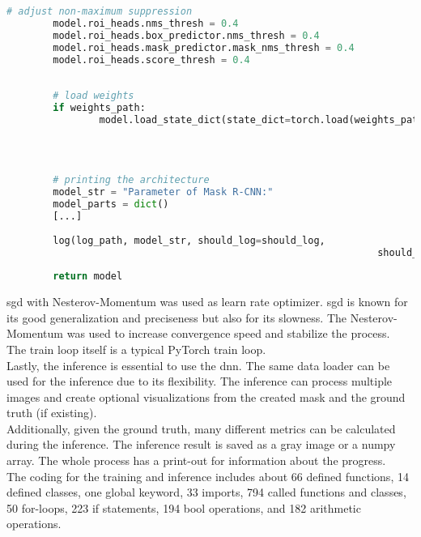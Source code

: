 \begin{lstlisting}[language=Python,caption=Loading function of Mask R-CNN using torchvision, label=lst:model-loading]
		# adjust non-maximum suppression
		model.roi_heads.nms_thresh = 0.4
		model.roi_heads.box_predictor.nms_thresh = 0.4  
		model.roi_heads.mask_predictor.mask_nms_thresh = 0.4
		model.roi_heads.score_thresh = 0.4
		
		
		# load weights
		if weights_path:
				model.load_state_dict(state_dict=torch.load(weights_path, 
																												weights_only=True)) 
		
		
		
		# printing the architecture
		model_str = "Parameter of Mask R-CNN:"
		model_parts = dict()
		[...]
		
		log(log_path, model_str, should_log=should_log, 
																should_print=should_print)
		
		return model
		\end{lstlisting}
		\fi
		\ac{sgd} with Nesterov-Momentum \cite{Botev2016} was used as learn rate optimizer. \ac{sgd} is known for its good generalization and preciseness but also for its slowness. The Nesterov-Momentum was used to increase convergence speed and stabilize the process.\\
		The train loop itself is a typical PyTorch train loop. \\
		Lastly, the inference is essential to use the \ac{dnn}. The same data loader can be used for the inference due to its flexibility. The inference can process multiple images and create optional visualizations from the created mask and the ground truth (if existing). \\
		Additionally, given the ground truth, many different metrics can be calculated during the inference. The inference result is saved as a gray image or a numpy array. The whole process has a print-out for information about the progress.\\
		The coding for the training and inference includes about 66 defined functions, 14 defined classes, one global keyword, 33 imports, 794 called functions and classes, 50 for-loops, 223 if statements, 194 bool operations, and 182 arithmetic operations.
	
		\clearpage
	
	
